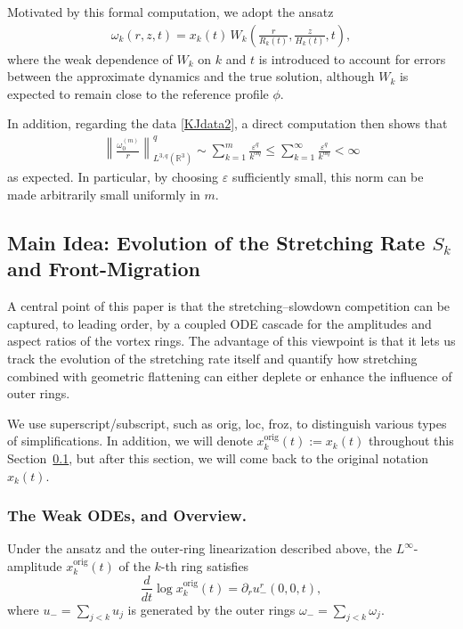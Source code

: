\documentclass[reqno,11pt]{amsart}
\begin{document}
Motivated by this formal computation, we adopt the ansatz
\begin{align}
\label{eq:ansatz}
    \omega_k(r,z,t)
    =
    x_k(t)\,
    W_k\!\left(
        \frac{r}{R_k(t)},
        \frac{z}{H_k(t)},
        t
    \right),
\end{align}
where the weak dependence of $W_k$ on $k$ and $t$ is introduced to account for errors between the approximate dynamics and the true solution, although $W_k$ is expected to remain close to the reference profile $\phi$.

In addition, regarding the data \eqref{KJdata2}, a direct computation then shows that
\begin{align*}
    \left\| \frac{\omega_0^{(m)}}{r} \right\|_{L^{3,q}(\mathbb{R}^3)}^q
    \sim
    \sum_{k=1}^{m} \frac{\varepsilon^q}{k^{\alpha q}}
    \leq
    \sum_{k=1}^{\infty} \frac{\varepsilon^q}{k^{\alpha q}}
    < \infty
\end{align*}
as expected.
In particular, by choosing $\varepsilon$ sufficiently small, this norm can be made arbitrarily small uniformly in $m$.




\subsection{Main Idea: Evolution of the Stretching Rate \texorpdfstring{$S_k$}{Sk} and Front-Migration}
\label{ODE_intro}
A central point of this paper is that the stretching--slowdown competition can be
captured, to leading order, by a coupled ODE cascade for the amplitudes and
aspect ratios of the vortex rings.  The advantage of this viewpoint is that it lets us
track the evolution of the stretching rate itself and quantify how stretching combined with geometric 
flattening can either deplete or enhance the influence of outer rings. 

We use superscript/subscript, such as orig, loc, froz, to distinguish various types of simplifications. In addition, we will denote $x_k^{\mathrm{orig}}(t):=x_k(t)$ throughout this Section~\ref{ODE_intro}, but after this section, we will come back to the original notation $x_k(t)$.

\subsubsection{The Weak ODEs, and Overview.}
\label{der_weak_ODE}
Under the ansatz and the outer-ring linearization described above, the
$L^\infty$-amplitude $x_k^{\mathrm{orig}}(t)$ of the $k$-th ring satisfies
\[
    \frac{d}{dt}\log x_k^{\mathrm{orig}}(t) =\partial_r u_-^r(0,0,t),
\]
where $u_-=\sum_{j<k}u_j$ is generated by the outer rings
$\omega_-=\sum_{j<k}\omega_j$.
\end{document}
